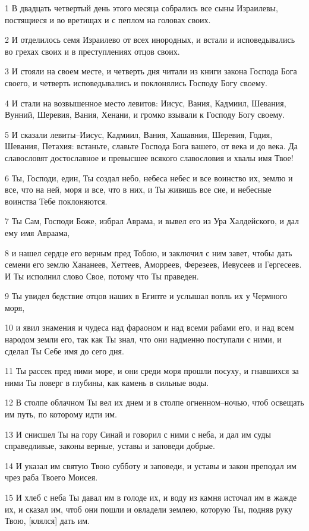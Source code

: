 \par 1 В двадцать четвертый день этого месяца собрались все сыны Израилевы, постящиеся и во вретищах и с пеплом на головах своих.
\par 2 И отделилось семя Израилево от всех инородных, и встали и исповедывались во грехах своих и в преступлениях отцов своих.
\par 3 И стояли на своем месте, и четверть дня читали из книги закона Господа Бога своего, и четверть исповедывались и поклонялись Господу Богу своему.
\par 4 И стали на возвышенное место левитов: Иисус, Вания, Кадмиил, Шевания, Вунний, Шеревия, Вания, Хенани, и громко взывали к Господу Богу своему.
\par 5 И сказали левиты--Иисус, Кадмиил, Вания, Хашавния, Шеревия, Годия, Шевания, Петахия: встаньте, славьте Господа Бога вашего, от века и до века. Да славословят достославное и превысшее всякого славословия и хвалы имя Твое!
\par 6 Ты, Господи, един, Ты создал небо, небеса небес и все воинство их, землю и все, что на ней, моря и все, что в них, и Ты живишь все сие, и небесные воинства Тебе поклоняются.
\par 7 Ты Сам, Господи Боже, избрал Аврама, и вывел его из Ура Халдейского, и дал ему имя Авраама,
\par 8 и нашел сердце его верным пред Тобою, и заключил с ним завет, чтобы дать семени его землю Хананеев, Хеттеев, Аморреев, Ферезеев, Иевусеев и Гергесеев. И Ты исполнил слово Свое, потому что Ты праведен.
\par 9 Ты увидел бедствие отцов наших в Египте и услышал вопль их у Чермного моря,
\par 10 и явил знамения и чудеса над фараоном и над всеми рабами его, и над всем народом земли его, так как Ты знал, что они надменно поступали с ними, и сделал Ты Себе имя до сего дня.
\par 11 Ты рассек пред ними море, и они среди моря прошли посуху, и гнавшихся за ними Ты поверг в глубины, как камень в сильные воды.
\par 12 В столпе облачном Ты вел их днем и в столпе огненном--ночью, чтоб освещать им путь, по которому идти им.
\par 13 И снисшел Ты на гору Синай и говорил с ними с неба, и дал им суды справедливые, законы верные, уставы и заповеди добрые.
\par 14 И указал им святую Твою субботу и заповеди, и уставы и закон преподал им чрез раба Твоего Моисея.
\par 15 И хлеб с неба Ты давал им в голоде их, и воду из камня источал им в жажде их, и сказал им, чтоб они пошли и овладели землею, которую Ты, подняв руку Твою, [клялся] дать им.
